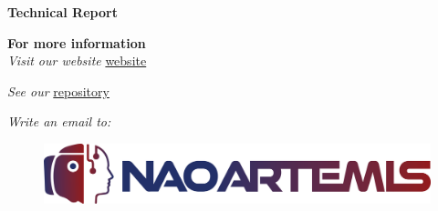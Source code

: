 \documentclass{optica-article}
\begin{document}
\begin{center}
    \Huge \textbf{Technical Report}
\end{center}
\author{\centering NaoChallenge 2025}
\bigskip

\noindent
\textbf{For more information} \\

\noindent\textit{Visit our website} \href{https://www.naoartemis.altervista.org/html}{website}

\noindent\textit{See our} \href{https://github.com/NaoArtemis/ChallengeNao25}{repository}

\noindent\textit{Write an email to: }

\bigskip

\begin{figure}
    \centering
    \includegraphics[scale=0.10]{figures/logo_v3.png}
    \label{fig:logo_con_scritta}
\end{figure}

\tableofcontents

\vspace{10pt}

\newpage
\end{document}

